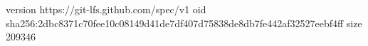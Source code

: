 version https://git-lfs.github.com/spec/v1
oid sha256:2dbc8371c70fee10c08149d41de7df407d75838de8db7fe442af32527eebf4ff
size 209346
